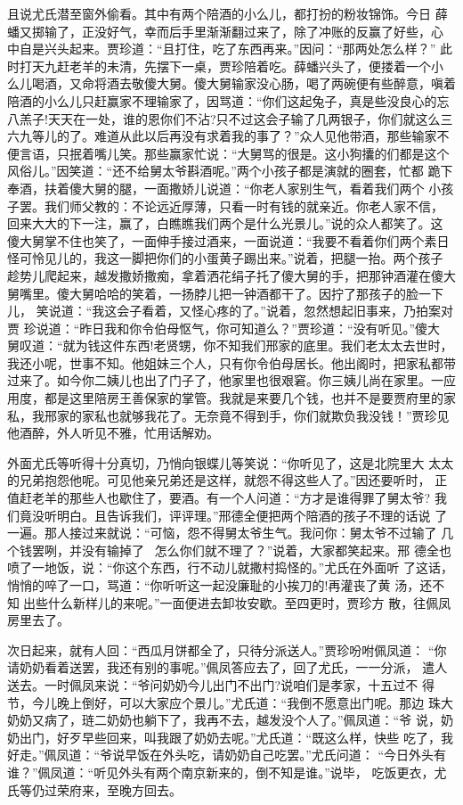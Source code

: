 且说尤氏潜至窗外偷看。其中有两个陪酒的小么儿，都打扮的粉妆锦饰。今日
薛蟠又掷输了，正没好气，幸而后手里渐渐翻过来了，除了冲账的反赢了好些，心
中自是兴头起来。贾珍道：“且打住，吃了东西再来。”因问：“那两处怎么样？”
此时打天九赶老羊的未清，先摆下一桌，贾珍陪着吃。薛蟠兴头了，便搂着一个小
么儿喝酒，又命将酒去敬傻大舅。傻大舅输家没心肠，喝了两碗便有些醉意，嗔着
陪酒的小么儿只赶赢家不理输家了，因骂道：“你们这起兔子，真是些没良心的忘
八羔子!天天在一处，谁的恩你们不沾?只不过这会子输了几两银子，你们就这么三
六九等儿的了。难道从此以后再没有求着我的事了？”众人见他带酒，那些输家不
便言语，只抿着嘴儿笑。那些赢家忙说：“大舅骂的很是。这小狗攮的们都是这个
风俗儿。”因笑道：“还不给舅太爷斟酒呢。”两个小孩子都是演就的圈套，忙都
跪下奉酒，扶着傻大舅的腿，一面撒娇儿说道：“你老人家别生气，看着我们两个
小孩子罢。我们师父教的：不论远近厚薄，只看一时有钱的就亲近。你老人家不信，
回来大大的下一注，赢了，白瞧瞧我们两个是什么光景儿。”说的众人都笑了。这
傻大舅掌不住也笑了，一面伸手接过酒来，一面说道：“我要不看着你们两个素日
怪可怜见儿的，我这一脚把你们的小蛋黄子踢出来。”说着，把腿一抬。两个孩子
趁势儿爬起来，越发撒娇撒痴，拿着洒花绢子托了傻大舅的手，把那钟酒灌在傻大
舅嘴里。傻大舅哈哈的笑着，一扬脖儿把一钟酒都干了。因拧了那孩子的脸一下儿，
笑说道：“我这会子看着，又怪心疼的了。”说着，忽然想起旧事来，乃拍案对贾
珍说道：“昨日我和你令伯母怄气，你可知道么？”贾珍道：“没有听见。”傻大
舅叹道：“就为钱这件东西!老贤甥，你不知我们邢家的底里。我们老太太去世时，
我还小呢，世事不知。他姐妹三个人，只有你令伯母居长。他出阁时，把家私都带
过来了。如今你二姨儿也出了门子了，他家里也很艰窘。你三姨儿尚在家里。一应
用度，都是这里陪房王善保家的掌管。我就是来要几个钱，也并不是要贾府里的家
私，我邢家的家私也就够我花了。无奈竟不得到手，你们就欺负我没钱！”贾珍见
他酒醉，外人听见不雅，忙用话解劝。

外面尤氏等听得十分真切，乃悄向银蝶儿等笑说：“你听见了，这是北院里大
太太的兄弟抱怨他呢。可见他亲兄弟还是这样，就怨不得这些人了。”因还要听时，
正值赶老羊的那些人也歇住了，要酒。有一个人问道：“方才是谁得罪了舅太爷?
我们竟没听明白。且告诉我们，评评理。”邢德全便把两个陪酒的孩子不理的话说
了一遍。那人接过来就说：“可恼，怨不得舅太爷生气。我问你：舅太爷不过输了
几个钱罢咧，并没有输掉了，怎么你们就不理了？”说着，大家都笑起来。邢
德全也喷了一地饭，说：“你这个东西，行不动儿就撒村捣怪的。”尤氏在外面听
了这话，悄悄的啐了一口，骂道：“你听听这一起没廉耻的小挨刀的!再灌丧了黄
汤，还不知出些什么新样儿的来呢。”一面便进去卸妆安歇。至四更时，贾珍方
散，往佩凤房里去了。

次日起来，就有人回：“西瓜月饼都全了，只待分派送人。”贾珍吩咐佩凤道：
“你请奶奶看着送罢，我还有别的事呢。”佩凤答应去了，回了尤氏，一一分派，
遣人送去。一时佩凤来说：“爷问奶奶今儿出门不出门?说咱们是孝家，十五过不
得节，今儿晚上倒好，可以大家应个景儿。”尤氏道：“我倒不愿意出门呢。那边
珠大奶奶又病了，琏二奶奶也躺下了，我再不去，越发没个人了。”佩凤道：“爷
说，奶奶出门，好歹早些回来，叫我跟了奶奶去呢。”尤氏道：“既这么样，快些
吃了，我好走。”佩凤道：“爷说早饭在外头吃，请奶奶自己吃罢。”尤氏问道：
“今日外头有谁？”佩凤道：“听见外头有两个南京新来的，倒不知是谁。”说毕，
吃饭更衣，尤氏等仍过荣府来，至晚方回去。

